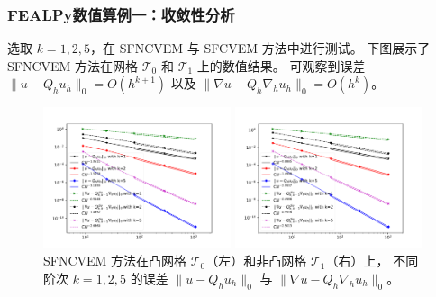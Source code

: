 \documentclass[notheorems,serif]{beamer}
\begin{document}
\begin{frame}
\frametitle{FEALPy数值算例一：收敛性分析}
选取 $k = 1, 2, 5$，在 SFNCVEM 与 SFCVEM 方法中进行测试。
下图展示了 SFNCVEM 方法在网格 $\mathcal T_0$ 和 $\mathcal T_1$ 上的数值结果。
可观察到误差 $\|u - Q_h u_h\|_0=O(h^{k+1})$ 以及 $\|\nabla u -
Q_{h}\nabla_h u_h\|_0=O(h^{k})$。
\begin{figure}[htbp]
\centering
\begin{minipage}[t]{0.49\linewidth}
\centering
\includegraphics[width=5.5cm]{../figures/stabfree/ncvem_convex.pdf}
\end{minipage}%
\begin{minipage}[t]{0.49\linewidth}
\centering
\includegraphics[width=5.5cm]{../figures/stabfree/ncvem_nonconvex.pdf}
\end{minipage}%
\centering
\caption{SFNCVEM 方法在凸网格 $\mathcal T_0$（左）和非凸网格 $\mathcal T_1$（右）上，
不同阶次 $k=1,2,5$ 的误差 $\|u - Q_h u_h\|_0$ 与 $\|\nabla u - Q_{h}\nabla_h u_h\|_0$。}
\label{fig:rate1}
\end{figure}
\end{frame}
\end{document}

